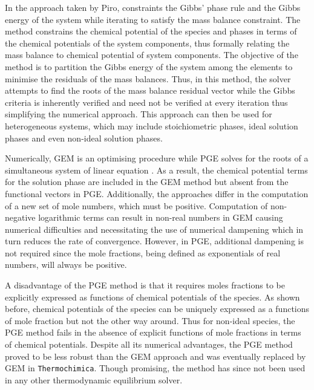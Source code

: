 	In the approach taken by Piro, constraints the Gibbs' phase rule and the Gibbs energy of the system while iterating to satisfy the mass balance constraint. The method constrains the chemical potential of the species and phases in terms of the chemical potentials of the system components, thus formally relating the mass balance to chemical potential of system components. The objective of the method is to partition the Gibbs energy of the system among the elements to minimise the residuals of the mass balances. Thus, in this method, the solver attempts to find the roots of the mass balance residual vector while the Gibbs criteria is inherently verified and need not be verified at every iteration thus simplifying the numerical approach. This approach can then be used for heterogeneous systems, which may include stoichiometric phases, ideal solution phases and even non-ideal solution phases.
	
	Numerically, GEM is an optimising procedure while PGE solves for the roots of a simultaneous system of linear equation \cite{vanZeggeren11}. As a result, the chemical potential terms for the solution phase are included in the GEM method but absent from the functional vectors in PGE. Additionally, the approaches differ in the computation of a new set of mole numbers, which must be positive. Computation of non-negative logarithmic terms can result in non-real numbers in GEM causing numerical difficulties and necessitating the use of numerical dampening which in turn reduces the rate of convergence. However, in PGE, additional  dampening is not required since the mole fractions, being defined as exponentials of real numbers, will always be positive. 
	
	A disadvantage of the PGE method is that it requires moles fractions to be explicitly expressed as functions of chemical potentials of the species. As shown before, chemical potentials of the species can be uniquely expressed as a functions of mole fraction but not the other way around. Thus for non-ideal species, the PGE method fails in the absence of explicit functions of mole fractions in terms of chemical potentials. Despite all its numerical advantages, the PGE method proved to be less robust than the GEM approach and was eventually replaced by GEM in \texttt{Thermochimica}. Though promising, the method has since not been used in any other thermodynamic equilibrium solver.
	
